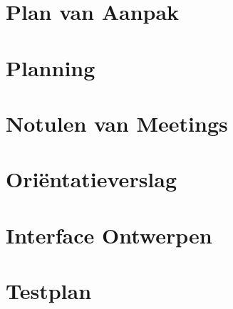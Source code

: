 \documentclass[dutch]{style/tudelft-report}
\begin{document}
\appendix



\chapter{Plan van Aanpak} \label{ch:plan-van-aanpak} 

\chapter{Planning} \label{ch:planning} 

\chapter{Notulen van Meetings} \label{ch:notulen-van-meetings} 

\chapter{Oriëntatieverslag} \label{ch:orientatieverslag} 

\chapter{Interface Ontwerpen} \label{ch:interface-ontwerpen} 

\chapter{Testplan} \label{ch:testplan} 


\end{document}

